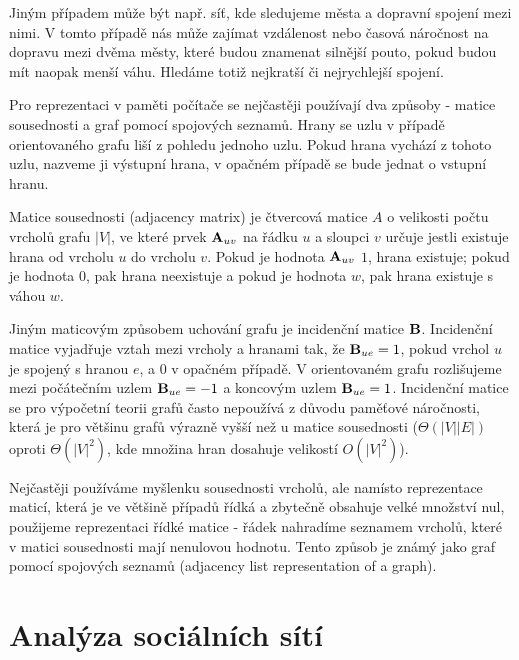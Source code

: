 \documentclass[12pt,titlepage]{report}
\begin{document}
Jiným případem může být např. síť, kde sledujeme města a dopravní spojení
mezi nimi. V tomto případě nás může zajímat vzdálenost nebo časová náročnost
na dopravu mezi dvěma městy, které budou znamenat silnější pouto, pokud budou
mít naopak menší váhu. Hledáme totiž nejkratší či nejrychlejší spojení.


Pro reprezentaci v paměti počítače se nejčastěji používají dva způsoby - matice
sousednosti a graf pomocí spojových seznamů.  Hrany se uzlu v případě
orientovaného grafu liší z pohledu jednoho uzlu. Pokud hrana vychází z tohoto
uzlu, nazveme ji výstupní hrana, v opačném případě se bude jednat o vstupní
hranu.


Matice sousednosti (adjacency matrix) je čtvercová matice $A$ o velikosti počtu
vrcholů grafu $|V|$, ve které prvek ${\bf A}_{uv}$ na řádku $u$ a sloupci $v$
určuje jestli existuje hrana od vrcholu $u$ do vrcholu $v$. Pokud je hodnota
${\bf A}_{uv}$ $1$, hrana existuje; pokud je hodnota $0$, pak hrana neexistuje
a pokud je hodnota $w$, pak hrana existuje s váhou $w$.

Jiným maticovým způsobem uchování grafu je incidenční matice ${\bf B}$.
Incidenční matice vyjadřuje vztah mezi vrcholy a hranami tak, že ${\bf B}_{ue}
= 1$, pokud vrchol $u$ je spojený s hranou $e$, a $0$ v opačném případě. V
orientovaném grafu rozlišujeme mezi počátečním uzlem ${\bf B}_{ue} = -1$ a
koncovým uzlem ${\bf B}_{ue} = 1$. Incidenční matice se pro výpočetní teorii
grafů často nepoužívá z důvodu paměťové náročnosti, která je pro většinu grafů
výrazně vyšší než u matice sousednosti ($\Theta(|V||E|)$ oproti $\Theta(|V|^2)$, kde množina hran dosahuje velikostí $O(|V|^2)$).

Nejčastěji používáme myšlenku sousednosti vrcholů, ale namísto reprezentace
maticí, která je ve většině případů řídká a zbytečně obsahuje velké množství
nul, použijeme reprezentaci řídké matice - řádek nahradíme seznamem vrcholů,
které v matici sousednosti mají nenulovou hodnotu. Tento způsob je známý jako
graf pomocí spojových seznamů (adjacency list representation of a graph).

\section{Analýza sociálních sítí}
\end{document}
